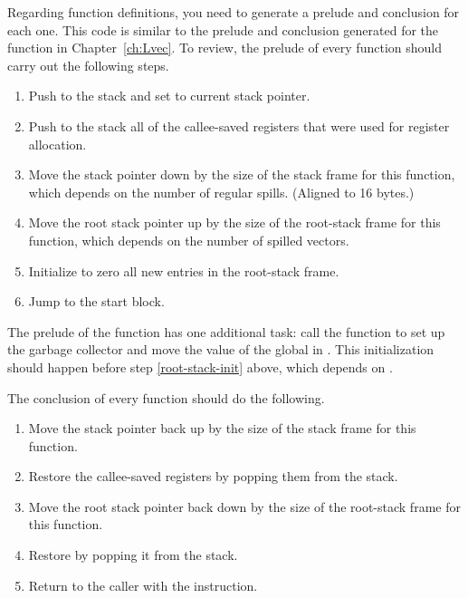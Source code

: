 \documentclass[7x10,nocrop]{TimesAPriori_MIT}%
\begin{document}
Regarding function definitions, you need to generate a prelude
and conclusion for each one. This code is similar to the prelude and
conclusion generated for the  function in
Chapter~\ref{ch:Lvec}. To review, the prelude of every function
should carry out the following steps.
\begin{enumerate}
\item Push  to the stack and set  to current stack
  pointer.
\item Push to the stack all of the callee-saved registers that were
  used for register allocation.
\item Move the stack pointer  down by the size of the stack
  frame for this function, which depends on the number of regular
  spills. (Aligned to 16 bytes.)
\item Move the root stack pointer  up by the size of the
  root-stack frame for this function, which depends on the number of
  spilled vectors. \label{root-stack-init}
\item Initialize to zero all new entries in the root-stack frame.
\item Jump to the start block.
\end{enumerate}
The prelude of the  function has one additional task: call
the  function to set up the garbage collector and
move the value of the global  in
. This initialization should happen before step \ref{root-stack-init}
above, which depends on .

The conclusion of every function should do the following.
\begin{enumerate}
\item Move the stack pointer back up by the size of the stack frame
  for this function.
\item Restore the callee-saved registers by popping them from the
  stack.
\item Move the root stack pointer back down by the size of the
  root-stack frame for this function.
\item Restore  by popping it from the stack.
\item Return to the caller with the  instruction.
\end{enumerate}
\end{document}
